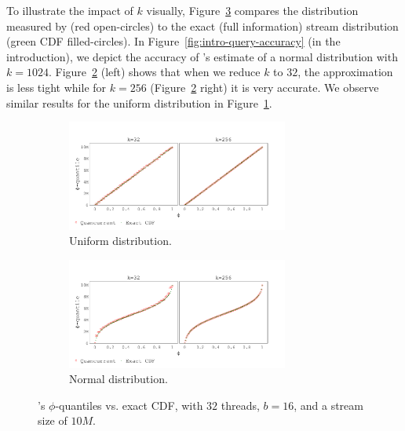 To illustrate the impact of $k$ visually, Figure~\ref{fig:cdf} compares the distribution measured by \mysketch (red open-circles) to the exact (full information) stream distribution (green CDF filled-circles). In Figure~\ref{fig:intro-query-accuracy} (in the introduction), we depict the accuracy of \mysketch's estimate of a normal distribution with $k=1024$. Figure~\ref{fig:cdf_normal} (left) shows that when we reduce $k$ to $32$, the approximation is less tight while for $k=256$ (Figure~\ref{fig:cdf_normal} right) it is very accurate. We observe similar results for the uniform distribution in Figure~\ref{fig:cdf_uniform}. 

\begin{figure}[h!]
\centering
    \begin{subfigure}[]{\textwidth}
        \centering
        \includegraphics[width=0.8\textwidth,trim={0.1cm 0.2cm 1.5cm 1cm},clip]
        {graphics/graphs/accuracy/Oracle_Quancurrent_blocking_numa_cdf_uniform_ks_32_256_b16_keys10M_runs1_uT_32_qT1_snapshot1_17-09-2022_06-51-43.pdf}
        \caption{Uniform distribution.} \label{fig:cdf_uniform}
    \end{subfigure}
    
    \begin{subfigure}[]{\textwidth}
        \centering
        \includegraphics[width=0.8\textwidth,trim={0.1cm 0.2cm 1.5cm 1cm},clip]
        {graphics/graphs/accuracy/Oracle_Quancurrent_blocking_numa_cdf_normal_ks_32_256_b16_keys10M_runs1_uT_32_qT1_snapshot1_17-09-2022_06-51-43.pdf}
        \caption{Normal distribution.} \label{fig:cdf_normal}
    \end{subfigure}

\caption{\mysketch's $\phi$-quantiles vs. exact CDF, with $32$ threads, $b=16$, and a stream size of $10M$.} \label{fig:cdf}
\end{figure}

